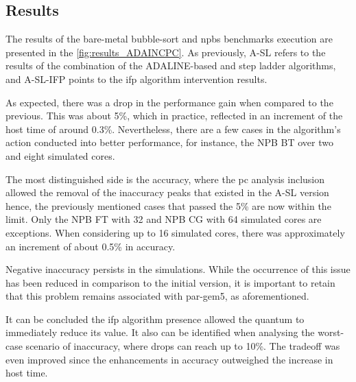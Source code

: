 \subsection{Results}

The results of the bare-metal bubble-sort and \glspl{npb} benchmarks execution are presented in the \autoref{fig:results_ADAINCPC}. As previously, 
A-SL refers to the results of the combination of the ADALINE-based and step ladder algorithms, and A-SL-IFP points to the 
\gls{ifp} algorithm intervention results.

As expected, there was a drop in the performance gain when compared to the previous. This was about 5\%, which in practice, 
reflected in an increment of the host time of around 0.3\%. Nevertheless, there are a few cases in the algorithm's action 
conducted into better performance, for instance, the NPB BT over two and eight simulated cores. 

The most distinguished side is the accuracy, where the \gls{pc} analysis inclusion allowed the removal of the inaccuracy peaks that existed 
in the A-SL version hence, the previously mentioned cases that passed the 5\% are now within the limit. Only the NPB FT with 32
and NPB CG with 64 simulated cores are exceptions. When considering up to 16 simulated cores, there was approximately an increment 
of about 0.5\% in accuracy. 

Negative inaccuracy persists in the simulations. While the occurrence of this issue has been reduced in comparison to the initial version, 
it is important to retain that this problem remains associated with par-gem5, as aforementioned. 

It can be concluded the \gls{ifp} algorithm presence allowed the quantum to immediately reduce its value. It also can be identified when 
analysing the worst-case scenario of inaccuracy, where drops can reach up to 10\%. The tradeoff was even improved since 
the enhancements in accuracy outweighed the increase in host time.

